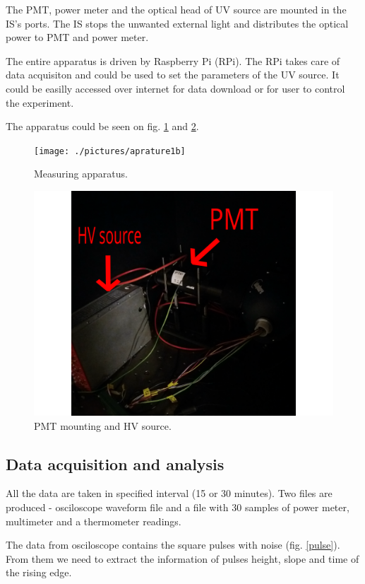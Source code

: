 \par
The PMT, power meter and the optical head of UV source are mounted in the IS's ports. The IS stops the unwanted external light and distributes the optical power to PMT and power meter. 
\par
The entire apparatus is driven by Raspberry Pi (RPi). The RPi takes care of data acquisiton and could be used to set the parameters of the UV source. It could be easilly accessed over internet for data download or for user to control the experiment.
\par


\par
The apparatus could be seen on fig. \ref{aparature1} and \ref{aparature2}.

\begin{figure}[H]
 \centering
 \texttt{[image: ./pictures/aprature1b]}
 \caption{Measuring apparatus.}
 \label{aparature1}
\end{figure}

\begin{figure}[H]
 \centering
 \includegraphics[scale = 0.09]{./pictures/aparature2b}
 \caption{PMT mounting and HV source.}
 \label{aparature2}
\end{figure}


\subsection{Data acquisition and analysis}
All the data are taken in specified interval (15 or 30 minutes). Two files are produced - osciloscope waveform file and a file with 30 samples of power meter, multimeter and a thermometer readings.
\par
The data from osciloscope contains the square pulses with noise (fig. \ref{pulse}). From them we need to extract the information of pulses height, slope and time of the rising edge.

